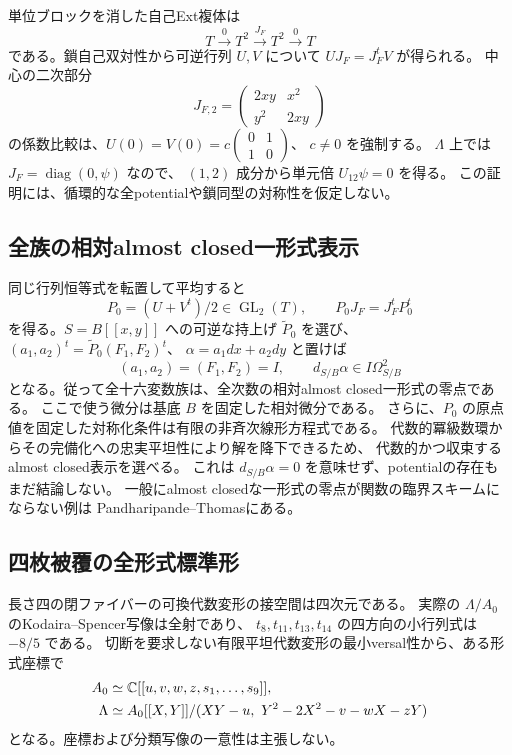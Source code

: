 単位ブロックを消した自己Ext複体は
\[
 T\xrightarrow{0}T^2\xrightarrow{J_F}T^2\xrightarrow{0}T
\]
である。鎖自己双対性から可逆行列 $U,V$ について $UJ_F=J_F^tV$ が得られる。
中心の二次部分
\[
 J_{F,2}=\begin{pmatrix}2xy&x^2\\y^2&2xy\end{pmatrix}
\]
の係数比較は、$U(0)=V(0)=c\left(\begin{smallmatrix}0&1\\1&0\end{smallmatrix}\right)$、
$c\ne0$ を強制する。
$\Lambda$ 上では $J_F=\operatorname{diag}(0,\psi)$ なので、
$(1,2)$ 成分から単元倍 $U_{12}\psi=0$ を得る。
この証明には、循環的な全potentialや鎖同型の対称性を仮定しない。

\subsection{全族の相対almost closed一形式表示}
同じ行列恒等式を転置して平均すると
\[
 P_0=(U+V^t)/2\in\operatorname{GL}_2(T),\qquad
 P_0J_F=J_F^tP_0^t
\]
を得る。$S=B[[x,y]]$ への可逆な持上げ $\widetilde P_0$ を選び、
$(a_1,a_2)^t=\widetilde P_0(F_1,F_2)^t$、
$\alpha=a_1dx+a_2dy$ と置けば
\[
 (a_1,a_2)=(F_1,F_2)=I,\qquad
 d_{S/B}\alpha\in I\Omega^2_{S/B}
\]
となる。従って全十六変数族は、全次数の相対almost closed一形式の零点である。
ここで使う微分は基底 $B$ を固定した相対微分である。
さらに、$P_0$ の原点値を固定した対称化条件は有限の非斉次線形方程式である。
代数的冪級数環からその完備化への忠実平坦性により解を降下できるため、
代数的かつ収束するalmost closed表示を選べる。
これは $d_{S/B}\alpha=0$ を意味せず、potentialの存在もまだ結論しない。
一般にalmost closedな一形式の零点が関数の臨界スキームにならない例は
Pandharipande--Thomas\cite{PT}にある。

\subsection{四枚被覆の全形式標準形}
長さ四の閉ファイバーの可換代数変形の接空間は四次元である。
実際の $\Lambda/A_0$ のKodaira--Spencer写像は全射であり、
$t_8,t_{11},t_{13},t_{14}$ の四方向の小行列式は $-8/5$ である。
切断を要求しない有限平坦代数変形の最小versal性から、ある形式座標で
\begin{align*}
 A_0&\simeq\mathbb C[[u,v,w,z,s_1,\ldots,s_9]],\\
 \Lambda&\simeq A_0[[X,Y]]/(XY-u,\ Y^2-2X^2-v-wX-zY)
\end{align*}
となる。座標および分類写像の一意性は主張しない。

